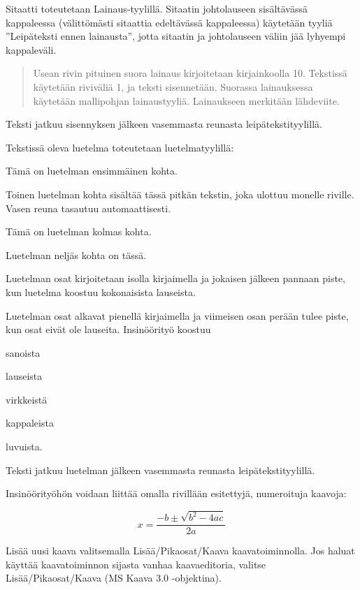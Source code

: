 Sitaatti toteutetaan Lainaus-tyylillä. Sitaatin johtolauseen sisältävässä kappaleessa (välittömästi sitaattia edeltävässä kappaleessa) käytetään tyyliä ”Leipäteksti ennen lainausta”, jotta sitaatin ja johtolauseen väliin jää lyhyempi kappaleväli.

\begin{quote}
Usean rivin pituinen suora lainaus kirjoitetaan kirjainkoolla 10. Tekstissä käytetään riviväliä 1, ja teksti sisennetään. Suorassa lainauksessa käytetään mallipohjan lainaustyyliä. Lainaukseen merkitään lähdeviite.
\end{quote}

Teksti jatkuu sisennyksen jälkeen vasemmasta reunasta leipätekstityylillä.

Tekstissä oleva luetelma toteutetaan luetelmatyylillä:

\begin{bullet-list}
  \item Tämä on luetelman ensimmäinen kohta.
  \item Toinen luetelman kohta sisältää tässä pitkän tekstin, joka ulottuu monelle riville. Vasen reuna tasautuu automaattisesti.
  \item Tämä on luetelman kolmas kohta.
  \item Luetelman neljäs kohta on tässä.
\end{bullet-list}

Luetelman osat kirjoitetaan isolla kirjaimella ja jokaisen jälkeen pannaan piste, kun luetelma koostuu kokonaisista lauseista.

Luetelman osat alkavat pienellä kirjaimella ja viimeisen osan perään tulee piste, kun osat eivät ole lauseita. Insinöörityö koostuu

\begin{bullet-list}
  \item sanoista
  \item lauseista
  \item virkkeistä
  \item kappaleista
  \item luvuista.
\end{bullet-list}

Teksti jatkuu luetelman jälkeen vasemmasta reunasta leipätekstityylillä.

Insinöörityöhön voidaan liittää omalla rivillään esitettyjä, numeroituja kaavoja:

\begin{equation}
  x = \frac{-b \pm \sqrt{b^{2} - 4ac}}{2a}
\end{equation}

Lisää uusi kaava valitsemalla Lisää/Pikaosat/Kaava kaavatoiminnolla. Jos haluat käyttää kaavatoiminnon sijasta vanhaa kaavaeditoria, valitse Lisää/Pikaosat/Kaava (MS Kaava 3.0 -objektina).